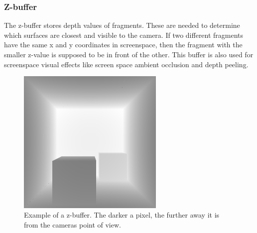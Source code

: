 \documentclass{ACGSeminar}
\begin{document}
		\subsubsection{Z-buffer}
			The z-buffer stores depth values of fragments. These are needed to determine which surfaces are closest and visible to the camera. If two different fragments have the same x and y coordinates in screenspace, then the fragment with the smaller z-value is supposed to be in front of the other. This buffer is also used for screenspace visual effects like screen space ambient occlusion and depth peeling. 
			\begin{figure}[htb!]%
				\begin{center}%
					\includegraphics[width=7cm]{img/z_buffer.png}
				\end{center}%
				\caption{Example of a z-buffer. The darker a pixel, the further away it is from the cameras point of view.}%
				\label{fig:z_buffer}
			\end{figure}%
\end{document}
